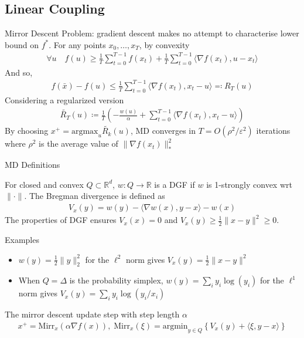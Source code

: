 \documentclass[10pt]{beamer}
\def\mbb#1{\mathbb{#1}}
\def \R{\mbb{R}}
\def \ve{\varepsilon}
\newcommand{\mg}[1]{\| #1 \|}
\renewcommand{\grad}{\nabla}
\newcommand{\1}{\mathbbm{1}}
\renewcommand{\set}[1]{\left\{#1\right\}}
\begin{document}
\subsection{Linear Coupling}
\begin{frame}{Mirror Descent}
    Problem: gradient descent makes no attempt to characterise lower bound on $f^*$. For any points $x_0, \ldots, x_T$, by convexity
    \begin{align*}
        \forall u \quad f(u) \geq \frac{1}{T} \sum_{t=0}^{T-1} f(x_t) + \frac 1T \sum_{t=0}^{T-1} \langle \grad f(x_t), u-x_t \rangle
    \end{align*}
    And so,
    \begin{align*}
        f(\bar x) - f(u) \leq \frac{1}{T} \sum_{t=0}^{T-1} \langle \grad f(x_t), x_t-u \rangle \eqqcolon R_T(u)
    \end{align*}
    Considering a regularized version
    \begin{align*}
        \widetilde{R_T}(u) \coloneqq \frac{1}{T} \left(-\frac{w(u)}{\alpha} + \sum_{t=0}^{T-1} \langle \grad f(x_t), x_t-u \rangle \right)
    \end{align*}
    By choosing $x^+ = \mathrm{argmax}_u \widetilde{R_k}(u)$, MD converges in $T = O(\rho^2 / \ve^2)$ iterations where $\rho^2$ is the average value of $\mg{\grad f(x_t)}_*^2$
\end{frame}
\begin{frame}{MD Definitions}
    \begin{definition}[]
        For closed and convex $Q \subset \R^d$, $w: Q \to \R$ is a DGF if $w$ is 1-strongly convex wrt $\mg{\cdot}$. The Bregman divergence is defined as
        \begin{align*}
            V_x(y) = w(y) - \langle \grad w(x), y-x \rangle - w(x)
        \end{align*}
        The properties of DGF ensures $V_x(x) = 0$ and $V_x(y) \geq \frac12 \mg{x-y}^2 \geq 0$.
    \end{definition}
    
    
    \begin{block}{Examples}
        \begin{itemize}
            \item $w(y) = \frac 12 \mg{y}_2^2$ for the $\ell^2$ norm gives $V_x(y) = \frac12 \mg{x-y}^2$
            \item When $Q = \Delta$ is the probability simplex, $w(y) = \sum_i y_i \log(y_i)$ for the $\ell^1$ norm gives $V_x(y) = \sum_i y_i \log(y_i/x_i)$ 
        \end{itemize}
    \end{block}
    \begin{definition}[]
        The mirror descent update step with step length $\alpha$ 
        \begin{align*}
            x^+ = \mathrm{Mirr}_x(\alpha \grad f(x)), \; \mathrm{Mirr}_x(\xi) = \mathrm{argmin}_{y \in Q} \set{V_x(y) + \langle  \xi, y-x \rangle}
        \end{align*}
    \end{definition}
\end{frame}
\end{document}
